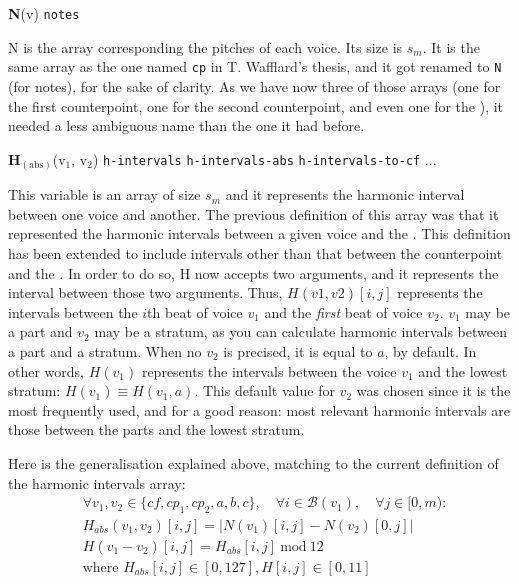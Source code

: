 \vspace{.5cm} \noindent \textbf{N}(v) \hspace{.2cm} \texttt{notes} 

N is the array corresponding the pitches of each voice. Its size is $s_m$. It is the same array as the one named \texttt{cp} in T. Wafflard's thesis, and it got renamed to \texttt{N} (for notes), for the sake of clarity. As we have now three of those arrays (one for the first counterpoint, one for the second counterpoint, and even one for the \cf), it needed a less ambiguous name than the one it had before.



\vspace{.5cm} \noindent \textbf{H}$_{(\text{abs})}$(v$_1$, v$_2$) \hspace{.2cm} \texttt{h-intervals}\hspace{.2cm} \texttt{h-intervals-abs}\hspace{.2cm} \texttt{h-intervals-to-cf}\hspace{.2cm}  ...

This variable is an array of size $s_m$ and it represents the harmonic interval between one voice and another. The previous definition of this array was that it represented the harmonic intervals between a given voice and the \cf. This definition has been extended to include intervals other than that between the counterpoint and the \cf. In order to do so, H now accepts two arguments, and it represents the interval between those two arguments. Thus, $H(v1,v2)[i,j]$ represents the intervals between the $i$th beat of voice $v_1$ and the \textit{first} beat of voice $v_2$. $v_1$ may be a part and $v_2$ may be a stratum, as you can calculate harmonic intervals between a part and a stratum. When no $v_2$ is precised, it is equal to $a$, by default. In other words, $H(v_1)$ represents the intervals between the voice $v_1$ and the lowest stratum: $H(v_1) \equiv H(v_1,a)$. This default value for $v_2$ was chosen since it is the most frequently used, and for a good reason: most relevant harmonic intervals are those between the parts and the lowest stratum.

Here is the generalisation explained above, matching to the current definition of the harmonic intervals array:
\begin{equation}
\begin{aligned}
    &\forall v_1, v_2 \in \{cf, cp_1, cp_2, a, b, c\}, \quad \forall i \in \mathcal{B}(v_1), \quad \forall j \in [0, m):\\
    &H_{abs}(v_1,v_2)[i, j] = \left|N(v_1)[i, j] - N(v_2)[0,j]\right|\\
    &H(v_1-v_2)[i, j] = H_{abs}[i, j]\ \text{mod}\ 12\\
    &\text{where } H_{abs}[i, j] \in [0, 127], H[i, j] \in [0, 11]
\end{aligned}
\end{equation}

